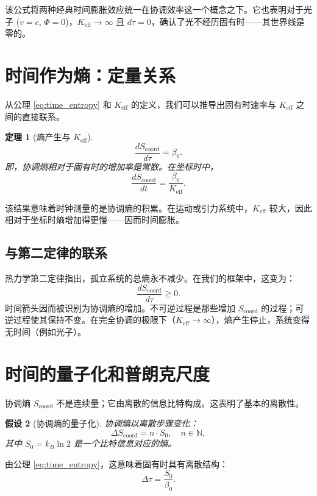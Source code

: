 \documentclass[12pt,a4paper]{article}
\newtheorem{theorem}{定理}[section]
\newtheorem{hypothesis}[theorem]{假设}
\newcommand{\Keff}{K_{\mathrm{eff}}}
\newcommand{\Scoord}{S_{\mathrm{coord}}}
\begin{document}
	该公式将两种经典时间膨胀效应统一在协调效率这一个概念之下。它也表明对于光子 (\(v=c\), \(\Phi=0\))，\(\Keff \to \infty\) 且 \(d\tau = 0\)，确认了光不经历固有时——其世界线是零的。
	
	\section{时间作为熵：定量关系}
	\label{sec:entropy}
	
	从公理 \ref{eq:time_entropy} 和 \(\Keff\) 的定义，我们可以推导出固有时速率与 \(\Keff\) 之间的直接联系。
	
	\begin{theorem}[熵产生与 \(\Keff\)]
		\[
		\frac{d\Scoord}{d\tau} = \beta_0.
		\]
		即，协调熵相对于固有时的增加率是常数。在坐标时中，
		\[
		\frac{d\Scoord}{dt} = \frac{\beta_0}{\Keff}.
		\]
	\end{theorem}
	
	该结果意味着时钟测量的是协调熵的积累。在运动或引力系统中，\(\Keff\) 较大，因此相对于坐标时熵增加得更慢——因而时间膨胀。
	
	\subsection{与第二定律的联系}
	
	热力学第二定律指出，孤立系统的总熵永不减少。在我们的框架中，这变为：
	\begin{equation}
		\frac{d\Scoord}{d\tau} \ge 0.
	\end{equation}
	时间箭头因而被识别为协调熵的增加。不可逆过程是那些增加 \(\Scoord\) 的过程；可逆过程使其保持不变。在完全协调的极限下（\(\Keff \to \infty\)），熵产生停止，系统变得无时间（例如光子）。
	
	\section{时间的量子化和普朗克尺度}
	\label{sec:quantization}
	
	协调熵 \(\Scoord\) 不是连续量；它由离散的信息比特构成。这表明了基本的离散性。
	
	\begin{hypothesis}[协调熵的量子化]
		协调熵以离散步骤变化：
		\begin{equation}
			\Delta \Scoord = n \cdot S_0, \quad n \in \mathbb{N},
		\end{equation}
		其中 \(S_0 = k_B \ln 2\) 是一个比特信息对应的熵。
	\end{hypothesis}
	
	由公理 \ref{eq:time_entropy}，这意味着固有时具有离散结构：
	\begin{equation}
		\Delta \tau = \frac{S_0}{\beta_0}.
	\end{equation}
	
\end{document}
